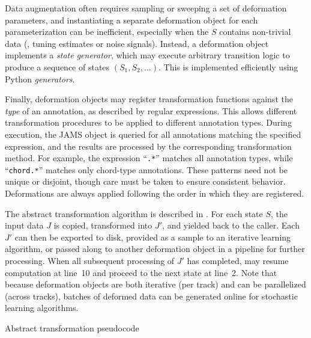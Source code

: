 \documentclass{article}
\begin{document}
Data augmentation often requires sampling or sweeping a set of deformation 
parameters, and instantiating a separate deformation object for each parameterization 
can be inefficient, especially when the $S$ contains non-trivial data (\eg, tuning estimates or noise signals).
Instead, a deformation object implements a \emph{state generator},
which may execute arbitrary transition logic to produce a sequence of 
states $(S_1, S_2, \dots)$.
This is implemented efficiently using Python \emph{generators}.

Finally, deformation objects may register transformation functions against the 
\emph{type} of an annotation, as described by regular expressions.
This allows different transformation procedures to be applied to different annotation types.
During execution, the JAMS object is queried for all annotations matching the specified
expression, and the results are processed by the corresponding transformation method.
For example, the expression ``\texttt{.*}'' matches all annotation types, while 
``\texttt{chord.*}'' matches only chord-type annotations.
These patterns need not be unique or disjoint, though care must be taken
to ensure consistent behavior.
Deformations are always applied following the order in which they are registered.

The abstract transformation algorithm is described in .
For each state $S$, the input data $J$ is copied, transformed into $J'$, and yielded back to the caller. 
Each $J'$ can then be exported to disk, provided as a sample to an iterative learning 
algorithm, or passed along to another deformation object in a pipeline for further processing.
When all subsequent processing of $J'$ has completed,  may resume
computation at line~10 and proceed to the next state at line~2. 
Note that because deformation objects are both iterative (per track) and can be parallelized (across
tracks), batches of deformed data can be generated online for stochastic learning algorithms.

\begin{algorithm}[t]
\caption{Abstract transformation pseudocode\label{alg:transformation}}
\begin{algorithmic}[1]
            \EndFor{}
        \EndFor{}
    \EndFor{}
    \EndFunction{}
\end{algorithmic}
\end{algorithm}
\end{document}
